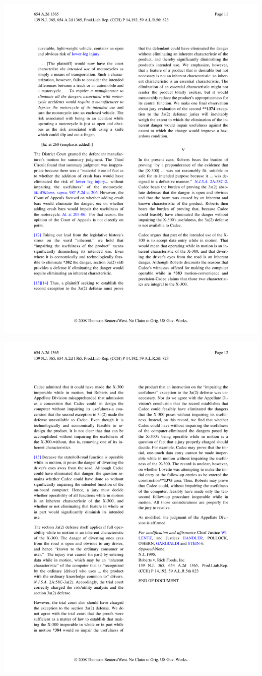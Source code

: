 \begin{center}\includegraphics[scale=0.95]{roberts/roberts11.pdf}\end{center}
\begin{center}\includegraphics[scale=0.95]{roberts/roberts12.pdf}\end{center}